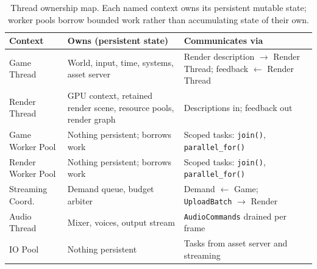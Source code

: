 \begin{table}[!tb]
\centering
\small
\renewcommand{\arraystretch}{1.25}
\begin{tabular}{@{}p{}p{}p{}@{}}
\toprule
\textbf{Context} & \textbf{Owns (persistent state)} & \textbf{Communicates via} \\
\midrule
Game Thread         & World, input, time, systems, asset server
                    & Render description $\rightarrow$ Render Thread; feedback $\leftarrow$ Render Thread \\[3pt]
Render Thread       & GPU context, retained render scene, resource pools, render graph
                    & Descriptions in; feedback out \\[3pt]
Game Worker Pool    & Nothing persistent; borrows work
                    & Scoped tasks: \texttt{join()}, \texttt{parallel\_for()} \\[3pt]
Render Worker Pool  & Nothing persistent; borrows work
                    & Scoped tasks: \texttt{join()}, \texttt{parallel\_for()} \\[3pt]
Streaming Coord.    & Demand queue, budget arbiter
                    & Demand $\leftarrow$ Game; \texttt{UploadBatch} $\rightarrow$ Render \\[3pt]
Audio Thread        & Mixer, voices, output stream
                    & \texttt{AudioCommands} drained per frame \\[3pt]
IO Pool             & Nothing persistent
                    & Tasks from asset server and streaming \\
\bottomrule
\end{tabular}
\caption{Thread ownership map. Each named context owns its persistent mutable state; worker pools borrow bounded work rather than accumulating state of their own.}
\label{tab:thread-ownership}
\end{table}
\FloatBarrier
